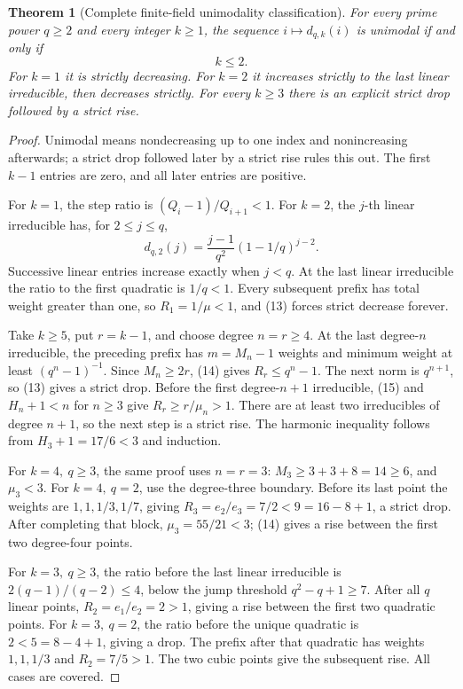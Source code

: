 \documentclass[11pt]{article}
\newtheorem{theorem}{Theorem}[section]
\begin{document}
\begin{theorem}[Complete finite-field unimodality classification]\label{thm:polyUnimodal}
For every prime power \(q\geq2\) and every integer \(k\geq1\),
the sequence \(i\mapsto d_{q,k}(i)\) is unimodal if and only if
\[
                         k\leq2.                 \tag{16}
\]
For \(k=1\) it is strictly decreasing. For \(k=2\) it increases
strictly to the last linear irreducible, then decreases strictly.
For every \(k\geq3\) there is an explicit strict drop followed by
a strict rise.
\end{theorem}
\begin{proof}
Unimodal means nondecreasing up to one index and nonincreasing
afterwards; a strict drop followed later by a strict rise rules this out.
The first \(k-1\) entries are zero, and all later entries are positive.

For \(k=1\), the step ratio is \((Q_i-1)/Q_{i+1}<1\).
For \(k=2\), the \(j\)-th linear irreducible has, for \(2\leq j\leq q\),
\[
 d_{q,2}(j)=\frac{j-1}{q^2}(1-1/q)^{j-2}.
\]
Successive linear entries increase exactly when \(j<q\).
At the last linear irreducible the ratio to the first quadratic
is \(1/q<1\). Every subsequent prefix has total weight greater than
one, so \(R_1=1/\mu<1\), and (13) forces strict decrease forever.

Take \(k\geq5\), put \(r=k-1\), and choose degree \(n=r\geq4\).
At the last degree-\(n\) irreducible, the preceding prefix has
\(m=M_n-1\) weights and minimum weight at least \((q^n-1)^{-1}\).
Since \(M_n\geq2r\), (14) gives \(R_r\leq q^n-1\).
The next norm is \(q^{n+1}\), so (13) gives a strict drop.
Before the first degree-\(n+1\) irreducible, (15) and
\(H_n+1<n\) for \(n\geq3\) give
\(R_r\geq r/\mu_n>1\).
There are at least two irreducibles of degree \(n+1\), so the
next step is a strict rise. The harmonic inequality follows from
\(H_3+1=17/6<3\) and induction.

For \(k=4,\ q\geq3\), the same proof uses \(n=r=3\):
\(M_3\geq3+3+8=14\geq6\), and \(\mu_3<3\).
For \(k=4,\ q=2\), use the degree-three boundary. Before its
last point the weights are \(1,1,1/3,1/7\), giving
\(R_3=e_2/e_3=7/2<9=16-8+1\), a strict drop.
After completing that block, \(\mu_3=55/21<3\); (14) gives
a rise between the first two degree-four points.

For \(k=3,\ q\geq3\), the ratio before the last linear
irreducible is \(2(q-1)/(q-2)\leq4\), below the jump threshold
\(q^2-q+1\geq7\). After all \(q\) linear points,
\(R_2=e_1/e_2=2>1\), giving a rise between the first two
quadratic points. For \(k=3,\ q=2\), the ratio before the unique
quadratic is \(2<5=8-4+1\), giving a drop. The prefix after that
quadratic has weights \(1,1,1/3\) and \(R_2=7/5>1\).
The two cubic points give the subsequent rise. All cases are covered.
\end{proof}
\end{document}
